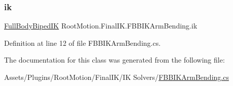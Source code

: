 \subsubsection{\texorpdfstring{ik}{ik}}
{\footnotesize\ttfamily \mbox{\hyperlink{class_root_motion_1_1_final_i_k_1_1_full_body_biped_i_k}{Full\+Body\+Biped\+IK}} Root\+Motion.\+Final\+I\+K.\+F\+B\+B\+I\+K\+Arm\+Bending.\+ik}



Definition at line 12 of file F\+B\+B\+I\+K\+Arm\+Bending.\+cs.



The documentation for this class was generated from the following file\+:\begin{DoxyCompactItemize}
\item 
Assets/\+Plugins/\+Root\+Motion/\+Final\+I\+K/\+I\+K Solvers/\mbox{\hyperlink{_f_b_b_i_k_arm_bending_8cs}{F\+B\+B\+I\+K\+Arm\+Bending.\+cs}}\end{DoxyCompactItemize}
